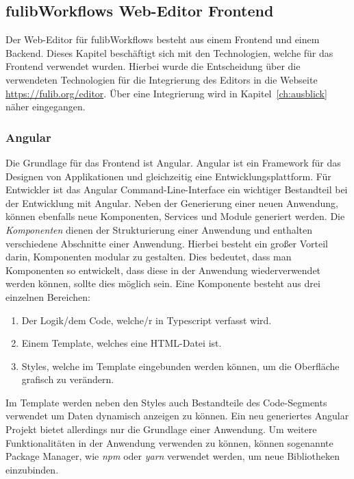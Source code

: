 \subsection{fulibWorkflows Web-Editor Frontend}\label{subsec:fulibworkflows-web-editor}
Der Web-Editor für fulibWorkflows besteht aus einem Frontend und einem Backend.
Dieses Kapitel beschäftigt sich mit den Technologien, welche für das Frontend verwendet wurden.
Hierbei wurde die Entscheidung über die verwendeten Technologien für die Integrierung des Editors in die Webseite \url{https://fulib.org/editor}.
Über eine Integrierung wird in Kapitel~\ref{ch:ausblick} näher eingegangen.

\subsubsection{Angular}
Die Grundlage für das Frontend ist Angular.
Angular ist ein Framework für das Designen von Applikationen und gleichzeitig eine Entwicklungsplattform.\cite*{angular}
Für Entwickler ist das Angular Command-Line-Interface ein wichtiger Bestandteil bei der Entwicklung mit Angular.
Neben der Generierung einer neuen Anwendung, können ebenfalls neue Komponenten, Services und Module generiert werden.
Die \textit{Komponenten} dienen der Strukturierung einer Anwendung und enthalten verschiedene Abschnitte einer Anwendung.
Hierbei besteht ein großer Vorteil darin, Komponenten modular zu gestalten.
Dies bedeutet, dass man Komponenten so entwickelt, dass diese in der Anwendung wiederverwendet werden können, sollte dies möglich sein.
Eine Komponente besteht aus drei einzelnen Bereichen:

\begin{enumerate}
    \item Der Logik/dem Code, welche/r in Typescript verfasst wird.
    \item Einem Template, welches eine HTML-Datei ist.
    \item Styles, welche im Template eingebunden werden können, um die Oberfläche grafisch zu verändern.
\end{enumerate}

Im Template werden neben den Styles auch Bestandteile des Code-Segments verwendet um Daten dynamisch anzeigen zu können.
Ein neu generiertes Angular Projekt bietet allerdings nur die Grundlage einer Anwendung.
Um weitere Funktionalitäten in der Anwendung verwenden zu können, können sogenannte Package Manager, wie \textit{npm} oder \textit{yarn}
verwendet werden, um neue Bibliotheken einzubinden.

